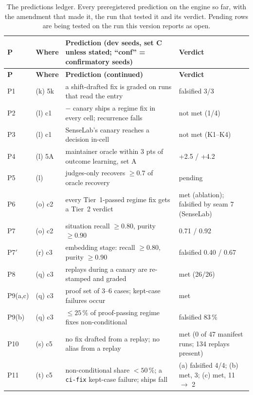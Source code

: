 \documentclass[11pt]{article}
\newcommand{\code}[1]{\texttt{#1}}
\begin{document}
{\scriptsize
\setlength{\tabcolsep}{4pt}
\begin{longtable}{@{}p{2.1cm}p{1.9cm}p{5.0cm}p{6.4cm}@{}}
\caption{The predictions ledger. Every preregistered prediction on the engine so far, with the
amendment that made it, the run that tested it and its verdict. Pending rows are being tested on
the run this version reports as open.}
\label{tab:ledger}\\
\toprule
\textbf{P} & \textbf{Where} & \textbf{Prediction (dev seeds, set C unless stated; ``conf'' = confirmatory seeds)} & \textbf{Verdict} \\
\midrule
\endfirsthead
\toprule
\textbf{P} & \textbf{Where} & \textbf{Prediction (continued)} & \textbf{Verdict} \\
\midrule
\endhead
\bottomrule
\endfoot
\endlastfoot
P1 & (k) 5k & a shift-drafted fix is graded on runs that read the entry & falsified 3/3 \\
P2 & (l) c1 & $-$ canary ships a regime fix in every cell; recurrence falls & not met (1/4) \\
P3 & (l) c1 & SenseLab's canary reaches a decision in-cell & not met (K1--K4) \\
P4 & (l) 5A & maintainer oracle within 3 pts of outcome learning, set A & +2.5 / +4.2 \\
P5 & (l) & judges-only recovers $\geq 0.7$ of oracle recovery & pending \\
P6 & (o) c2 & every Tier~1-passed regime fix gets a Tier~2 verdict & met (ablation); falsified by seam 7 (SenseLab) \\
P7 & (o) c2 & situation recall $\geq 0.80$, purity $\geq 0.90$ & 0.71 / 0.92 \\
P7$'$ & (r) c3 & embedding stage: recall $\geq 0.80$, purity $\geq 0.90$ & falsified 0.40 / 0.67 \\
P8 & (q) c3 & replays during a canary are re-stamped and graded & met (26/26) \\
P9(a,c) & (q) c3 & proof set of 3--6 cases; kept-case failures occur & met \\
P9(b) & (q) c3 & $\leq 25\,\%$ of proof-passing regime fixes non-conditional & falsified 83\,\% \\
P10 & (s) c5 & no fix drafted from a replay; no alias from a replay & met (0 of 47 manifest runs; 134 replays present) \\
P11 & (t) c5 & non-conditional share $< 50\,\%$; a \code{ci-fix} kept-case failure; ships fall & (a) falsified 4/4; (b) met, 3; (c) met, 11 $\to$ 2 \\

\end{longtable}}
\end{document}

